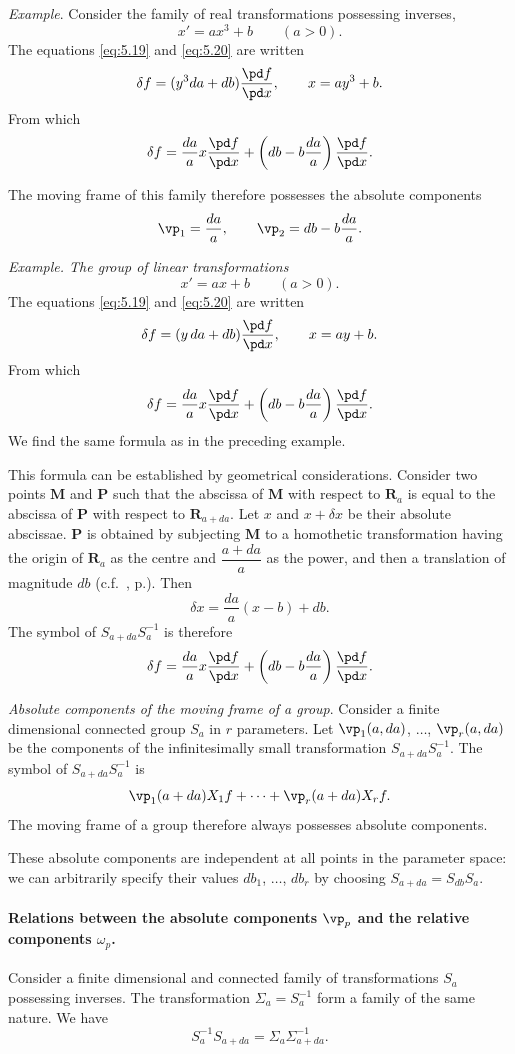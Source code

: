 {\small
\emph{Example}. Consider the family of real transformations possessing inverses,
\[
x'=ax^{3}+b\qquad (a>0).
\]
The equations \eqref{eq:5.19} and \eqref{eq:5.20} are written
\[
\delta f=(y^{3}da+db)\frac{\pd f}{\pd x},\qquad x=ay^{3}+b.
\]
From which
\[
\delta f=\frac{da}{a}x\frac{\pd f}{\pd x}+\left(db-b\frac{da}{a}\right)\frac{\pd f}{\pd x}.
\]

The moving frame of this family therefore possesses the absolute components
\[
\vp_{1}=\frac{da}{a},\qquad\vp_{2}=db-b\frac{da}{a}.
\]

\somespace

\emph{Example. The group of linear transformations}
\[
x'=ax+b\qquad(a>0).
\]
The equations \eqref{eq:5.19} and \eqref{eq:5.20} are written
\[
\delta f=(y\,da+db)\frac{\pd f}{\pd x},\qquad x=ay+b.
\]
From which
\[
\delta f=\frac{da}{a}x\frac{\pd f}{\pd x}+\left(db-b\frac{da}{a}\right)\frac{\pd f}{\pd x}.
\]
We find the same formula as in the preceding example.

This formula can be established by geometrical considerations. Consider two points $\mathbf{M}$ and $\mathbf{P}$ such that the abscissa of $\mathbf{M}$ with respect to $\mathbf{R}_{a}$ is equal to the abscissa of $\mathbf{P}$ with respect to $\mathbf{R}_{a+da}$. Let $x$ and $x+\delta x$ be their absolute abscissae. $\mathbf{P}$ is obtained by subjecting $\mathbf{M}$ to a homothetic transformation having the origin of $\mathbf{R}_{a}$ as the centre and $\dfrac{a+da}{a}$ as the power, and then a translation of magnitude $db$ (c.f.~, p.\pageref{sec:64}). Then
\[
\delta x=\frac{da}{a}(x-b)+db.
\]
The symbol of $S_{a+da}S_{a}^{-1}$ is therefore
\[
\delta f=\frac{da}{a}x\frac{\pd f}{\pd x}+\left(db-b\frac{da}{a}\right)\frac{\pd f}{\pd x}.
\]
}

\emph{Absolute components of the moving frame of a group}. Consider a finite dimensional connected group $S_{a}$ in $r$ parameters. Let $\vp_{1}(a,da)$, $\dots$, $\vp_{r}(a,da)$ be the components of the infinitesimally small transformation $S_{a+da}S_{a}^{-1}$. The symbol of $S_{a+da}S_{a}^{-1}$ is
\[
\vp_{1}(a+da)X_{1}f+\dots+\vp_{r}(a+da)X_{r}f.
\]
The moving frame of a group therefore always possesses absolute components.

These absolute components are independent at all points in the parameter space: we can arbitrarily specify their values $db_{1}$, $\dots$, $db_{r}$ by choosing $S_{a+da}=S_{db}S_{a}$.

\paragraph{Relations between the absolute components $\vp_p$ and the relative components $\omega_p$.}
\label{sec:75}
Consider a finite dimensional and connected family of transformations $S_{a}$ possessing inverses. The transformation $\Sigma_{a}=S_{a}^{-1}$ form a family of the same nature. We have
\[
S_{a}^{-1}S_{a+da}=\Sigma_{a}\Sigma_{a+da}^{-1}.
\]

